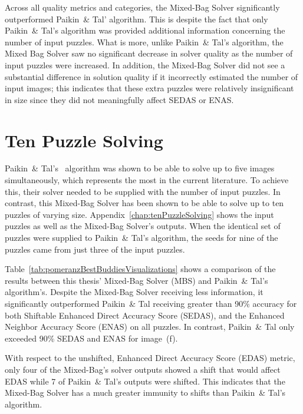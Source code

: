 Across all quality metrics and categories, the Mixed-Bag Solver significantly outperformed Paikin~\& Tal' algorithm.  This is despite the fact that only Paikin~\& Tal's algorithm was provided additional information concerning the number of input puzzles.  What is more, unlike Paikin~\& Tal's algorithm, the Mixed Bag Solver saw no significant decrease in solver quality as the number of input puzzles were increased.  In addition, the Mixed-Bag Solver did not see a substantial difference in solution quality if it incorrectly estimated the number of input images; this indicates that these extra puzzles were relatively insignificant in size since they did not meaningfully affect SEDAS or ENAS.  

\section{Ten Puzzle Solving}

Paikin~\& Tal's~\cite{paikin2015} algorithm was shown to be able to solve up to five images simultaneously, which represents the most in the current literature.  To achieve this, their solver needed to be supplied with the number of input puzzles.  In contrast, this Mixed-Bag Solver has been shown to be able to solve up to ten puzzles of varying size.  Appendix~\ref{chap:tenPuzzleSolving} shows the input puzzles as well as the Mixed-Bag Solver's outputs. When the identical set of puzzles were supplied to Paikin~\& Tal's algorithm, the seeds for nine of the puzzles came from just three of the input puzzles.  

Table~\ref{tab:pomeranzBestBuddiesVisualizations} shows a comparison of the results between this thesis' Mixed-Bag Solver (MBS) and Paikin~\& Tal's algorithm's.  Despite the Mixed-Bag Solver receiving less information, it significantly outperformed Paikin~\& Tal receiving greater than 90\% accuracy for both  Shiftable Enhanced Direct Accuracy Score (SEDAS), and the Enhanced Neighbor Accuracy Score (ENAS) on all puzzles.  In contrast, Paikin~\& Tal only exceeded 90\% SEDAS and ENAS for image~(f). 

With respect to the unshifted, Enhanced Direct Accuracy Score (EDAS) metric, only four of the Mixed-Bag's solver outputs showed a shift that would affect EDAS while 7 of Paikin~\& Tal's outputs were shifted. This indicates that the Mixed-Bag Solver has a much greater immunity to shifts than Paikin~\& Tal's algorithm.


